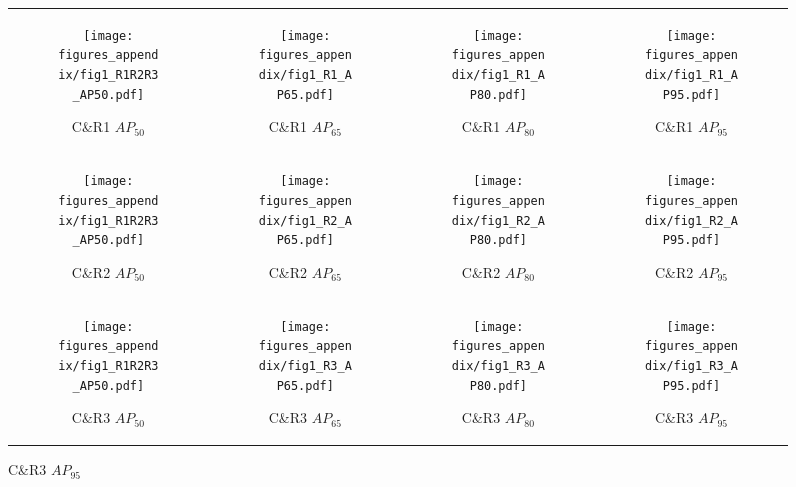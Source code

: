 \documentclass{article}
\begin{document}
\begin{figure}
\centering
\begin{tabular}{cccc}
\begin{subfigure}{0.20\textwidth}
\texttt{[image: figures\_appendix/fig1\_R1R2R3\_AP50.pdf]}
\caption{C\&R1 $AP_{50}$}\label{fig:pr_1}
\end{subfigure}&
\begin{subfigure}{0.20\textwidth}
\texttt{[image: figures\_appendix/fig1\_R1\_AP65.pdf]}
\caption{C\&R1 $AP_{65}$}\label{fig:pr_2}
\end{subfigure}&
\begin{subfigure}{0.20\textwidth}
\texttt{[image: figures\_appendix/fig1\_R1\_AP80.pdf]}
\caption{C\&R1 $AP_{80}$}\label{fig:pr_3}
\end{subfigure}&
\begin{subfigure}{0.20\textwidth}
\texttt{[image: figures\_appendix/fig1\_R1\_AP95.pdf]}
\caption{C\&R1 $AP_{95}$}\label{fig:pr_4}
\end{subfigure}\\

\begin{subfigure}{0.20\textwidth}
\texttt{[image: figures\_appendix/fig1\_R1R2R3\_AP50.pdf]}
\caption{C\&R2 $AP_{50}$}\label{fig:pr_5}
\end{subfigure}&
\begin{subfigure}{0.20\textwidth}
\texttt{[image: figures\_appendix/fig1\_R2\_AP65.pdf]}
\caption{C\&R2 $AP_{65}$}\label{fig:pr_6}
\end{subfigure}&
\begin{subfigure}{0.20\textwidth}
\texttt{[image: figures\_appendix/fig1\_R2\_AP80.pdf]}
\caption{C\&R2 $AP_{80}$}\label{fig:pr_7}
\end{subfigure}&
\begin{subfigure}{0.20\textwidth}
\texttt{[image: figures\_appendix/fig1\_R2\_AP95.pdf]}
\caption{C\&R2 $AP_{95}$}\label{fig:pr_8}
\end{subfigure}\\

\begin{subfigure}{0.20\textwidth}
\texttt{[image: figures\_appendix/fig1\_R1R2R3\_AP50.pdf]}
\caption{C\&R3 $AP_{50}$}\label{fig:pr_9}
\end{subfigure}&
\begin{subfigure}{0.20\textwidth}
\texttt{[image: figures\_appendix/fig1\_R3\_AP65.pdf]}
\caption{C\&R3 $AP_{65}$}\label{fig:pr_10}
\end{subfigure}&
\begin{subfigure}{0.20\textwidth}
\texttt{[image: figures\_appendix/fig1\_R3\_AP80.pdf]}
\caption{C\&R3 $AP_{80}$}\label{fig:pr_11}
\end{subfigure}&
\begin{subfigure}{0.20\textwidth}
\texttt{[image: figures\_appendix/fig1\_R3\_AP95.pdf]}
\caption{C\&R3 $AP_{95}$}\label{fig:pr_12}
\end{subfigure}\\
\end{tabular}


\end{figure}
\end{document}
